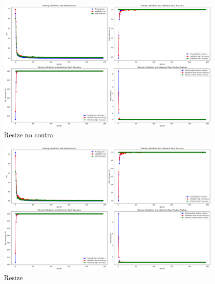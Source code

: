 \begin{figure}[H]
  \centering
  \includegraphics[scale=0.3]{figures/Resize_No_contra.png} 
  \caption{Resize no contra}
  \label{fig:Resize_No_contra_b64}
\end{figure}

\begin{figure}[H]
  \centering
  \includegraphics[scale=0.3]{figures/Resize.png} 
  \caption{Resize}
  \label{fig:Resize_b64}
\end{figure}
